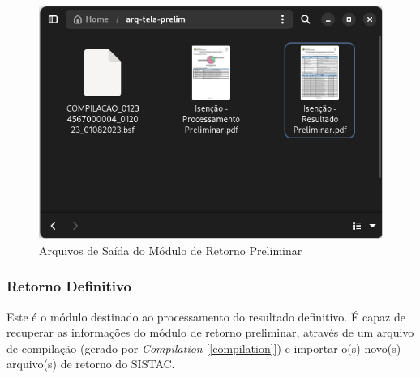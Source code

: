 \documentclass[
	12pt,			%
	openright,		%
	oneside,	
	a4paper,		%
	english,		%
	brazil			%
]{abntex2/abntex2}  %
\begin{document}
					\begin{figure}[H]
						\begin{center}
							
							\caption{Arquivos de Saída do Módulo de Retorno Preliminar}
							\label{retorno-prelim-files}
							
							\includegraphics[scale=0.5]{img/retorno-prelim-files}
							
						\end{center}
					\end{figure}
		
				\subsubsection{Retorno Definitivo}
	
					Este é o módulo destinado ao processamento do resultado definitivo. É capaz de recuperar as informações do módulo de retorno preliminar, através de um arquivo de compilação (gerado por \textit{Compilation} [\ref{compilation}]) e importar o(s) novo(s) arquivo(s) de retorno do SISTAC.
\end{document}
